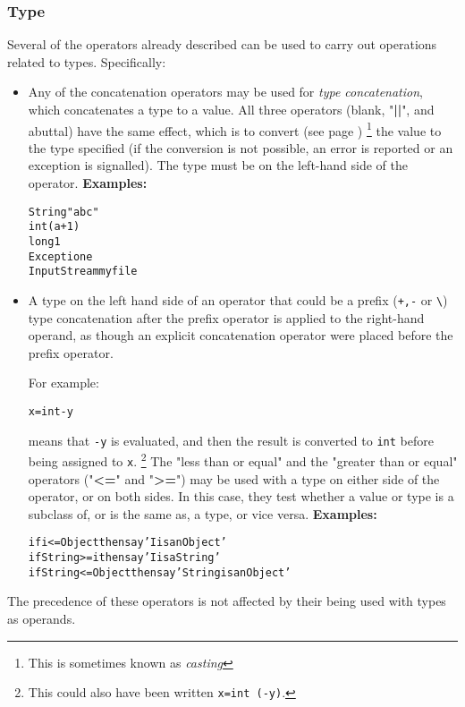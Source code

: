 \subsubsection{Type}\label{reftypeops}
Several of the operators already described can be used to carry out
operations related to types.  Specifically:
\begin{itemize}
\item Any of the concatenation operators may be used for \emph{type
concatenation}, which concatenates a type to a value.  All three
operators (blank, "\textbf{||}", and abuttal) have the same
effect, which is to  convert (see page \pageref{refconv}) 
\footnote{
This is sometimes known as \emph{casting}
}
the value to the type
specified (if the conversion is not possible, an error is reported or an
exception is signalled).
The type must be on the left-hand side of the operator.
 \textbf{Examples:}
\begin{alltt}
String "abc"
int (a+1)
long 1
Exception e
InputStream myfile
\end{alltt}
\item 
{}
A type on the left hand side of an operator that could be a prefix
(\texttt{+,-} or \texttt{\textbackslash})
type concatenation after the prefix operator is applied to the
right-hand operand, as though an explicit concatenation operator were
placed before the prefix operator.

For example:
\begin{alltt}
x=int -y
\end{alltt}
means that \texttt{-y} is evaluated, and then the result is
converted to \texttt{int} before being assigned to \texttt{x}.
\footnote{
This could also have been written \texttt{x=int (-y)}.
}
The "less than or equal" and the "greater than or equal"
operators ("\textbf{<=}" and "\textbf{>=}") may be used
with a type on either side of the operator, or on both sides.
In this case, they test whether a value or type is a subclass of, or is
the same as, a type, or vice versa.
 \textbf{Examples:}
\begin{alltt}
if i<=Object then say 'I is an Object'
if String>=i then say 'I is a String'
if String<=Object then say 'String is an Object'
\end{alltt}
\end{itemize}
The precedence of these operators is not affected by their being
used with types as operands.
